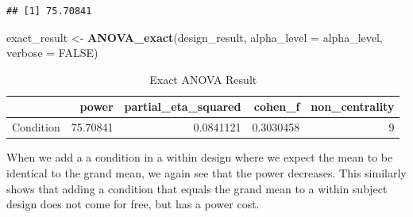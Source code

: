 \documentclass[
]{book}
\newenvironment{Shaded}{\begin{snugshade}}{\end{snugshade}}
\newcommand{\CommentTok}[1]{\textcolor[rgb]{0.56,0.35,0.01}{\textit{#1}}}
\newcommand{\DataTypeTok}[1]{\textcolor[rgb]{0.13,0.29,0.53}{#1}}
\newcommand{\DecValTok}[1]{\textcolor[rgb]{0.00,0.00,0.81}{#1}}
\newcommand{\FloatTok}[1]{\textcolor[rgb]{0.00,0.00,0.81}{#1}}
\newcommand{\KeywordTok}[1]{\textcolor[rgb]{0.13,0.29,0.53}{\textbf{#1}}}
\newcommand{\NormalTok}[1]{#1}
\newcommand{\OperatorTok}[1]{\textcolor[rgb]{0.81,0.36,0.00}{\textbf{#1}}}
\newcommand{\OtherTok}[1]{\textcolor[rgb]{0.56,0.35,0.01}{#1}}
\newcommand{\StringTok}[1]{\textcolor[rgb]{0.31,0.60,0.02}{#1}}
\begin{document}
\begin{verbatim}
## [1] 75.70841
\end{verbatim}

\begin{Shaded}
\begin{Highlighting}[]
\NormalTok{exact_result <-}\StringTok{ }\KeywordTok{ANOVA_exact}\NormalTok{(design_result,}
                            \DataTypeTok{alpha_level =}\NormalTok{ alpha_level,}
                            \DataTypeTok{verbose =} \OtherTok{FALSE}\NormalTok{)}
\end{Highlighting}
\end{Shaded}

\begin{table}[!h]

\caption{\label{tab:unnamed-chunk-250}Exact ANOVA Result}
\centering
\begin{tabular}[t]{l|r|r|r|r}
\hline
  & power & partial\_eta\_squared & cohen\_f & non\_centrality\\
\hline
Condition & 75.70841 & 0.0841121 & 0.3030458 & 9\\
\hline
\end{tabular}
\end{table}

When we add a a condition in a within design where we expect the mean to be identical to the grand mean, we again see that the power decreases. This similarly shows that adding a condition that equals the grand mean to a within subject design does not come for free, but has a power cost.

\begin{Shaded}
\end{Shaded}
\end{document}
